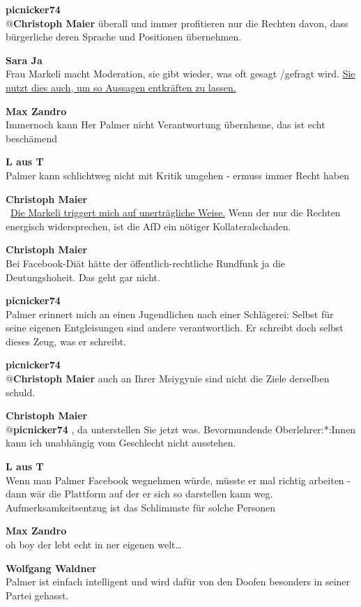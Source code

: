 \documentclass[a4,parindent=0pt]{article}
\begin{document}
\textbf{picnicker74}\\
@\textbf{Christoph Maier} überall und immer profitieren nur die Rechten
davon, dass bürgerliche deren Sprache und Positionen übernehmen.

\textbf{Sara Ja}\\
Frau Markeli macht Moderation, sie gibt wieder, was oft gesagt /gefragt
wird.
\hyperref[timeout]{Sie nutzt dies auch, um so Aussagen
entkräften zu lassen.}

\textbf{Max Zandro}\\
Immernoch kann Her Palmer nicht Verantwortung übernheme, das ist echt
beschämend

\textbf{L aus T}\\
Palmer kann schlichtweg nicht mit Kritik umgehen - ermuss immer Recht
haben

\textbf{Christoph Maier}\\
~\hyperref[timeout]{Die Markeli triggert mich auf unerträgliche
Weise.} Wenn der nur die Rechten energisch widersprechen, ist die AfD
ein nötiger Kollateralschaden.

\textbf{Christoph Maier}\\
Bei Facebook-Diät hätte der öffentlich-rechtliche Rundfunk ja die Deutungshoheit\cite{deutungshoheit}. Das geht gar nicht.

\textbf{picnicker74}\\
Palmer erinnert mich an einen Jugendlichen nach einer Schlägerei:
Selbst für seine eigenen Entgleisungen sind andere verantwortlich. Er
schreibt doch selbst dieses Zeug, was er schreibt.

\textbf{picnicker74}\\
@\textbf{Christoph Maier} auch an Ihrer Msiygynie sind nicht die Ziele
derselben schuld.

\textbf{Christoph Maier}\\
@\textbf{picnicker74} , da unterstellen Sie jetzt was. Bevormundende
Oberlehrer:*:Innen kann ich unabhängig vom Geschlecht nicht ausstehen.

\textbf{L aus T}\\
Wenn man Palmer Facebook wegnehmen würde, müsste er mal richtig
arbeiten - dann wär die Plattform auf der er sich so darstellen kann
weg. Aufmerksamkeitsentzug ist das Schlimmste für solche Personen

\textbf{Max Zandro}\\
oh boy der lebt echt in ner eigenen welt\ldots{}

\textbf{Wolfgang Waldner}\\
Palmer ist einfach intelligent und wird dafür von den Doofen besonders
in seiner Partei gehasst.
\end{document}
